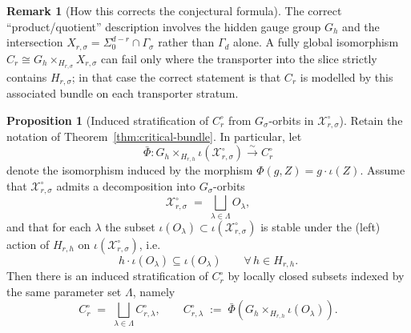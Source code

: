 \documentclass{article}
\theoremstyle{definition}
\newtheorem{proposition}[theorem]{Proposition}
\newtheorem{remark}[theorem]{Remark}
\begin{document}
\begin{remark}[How this corrects the conjectural formula]
The correct ``product/quotient'' description involves the hidden gauge group $G_h$ and the intersection $X_{r,\sigma} = \Sigma_0^{d-r} \cap \Gamma_\sigma$ rather than $\Gamma_d$ alone.  A fully global isomorphism $C_r \cong G_h \times_{H_{r,\sigma}} X_{r,\sigma}$ can fail only where the transporter into the slice strictly contains $H_{r,\sigma}$; in that case the correct statement is that $C_r$ is modelled by this associated bundle on each transporter stratum.
\end{remark}
\begin{proposition}[Induced stratification of $C_r^{\circ}$ from $G_\sigma$-orbits in $\mathcal X_{r,\sigma}^{\circ}$]
\label{prop:stratify-Cr-from-Xrsigma}
Retain the notation of Theorem~\ref{thm:critical-bundle}. In particular, let
\[
\bar\Phi \colon G_h \times_{H_{r,h}} \iota(\mathcal X_{r,\sigma}^{\circ}) \xrightarrow{\ \sim\ } C_r^{\circ}
\]
denote the isomorphism induced by the morphism $\Phi(g,Z)=g\cdot \iota(Z)$.
Assume that $\mathcal X_{r,\sigma}^{\circ}$ admits a decomposition into $G_\sigma$-orbits
\[
\mathcal X_{r,\sigma}^{\circ} \;=\; \bigsqcup_{\lambda\in\Lambda} O_\lambda,
\]
and that for each $\lambda$ the subset $\iota(O_\lambda)\subset \iota(\mathcal X_{r,\sigma}^{\circ})$ is stable under the (left) action of $H_{r,h}$ on $\iota(\mathcal X_{r,\sigma}^{\circ})$, i.e.
\[
h\cdot \iota(O_\lambda)\subseteq \iota(O_\lambda)\qquad \forall\, h\in H_{r,h}.
\]
Then there is an induced stratification of $C_r^{\circ}$ by locally closed subsets indexed by the same parameter set $\Lambda$, namely
\[
C_r^{\circ} \;=\; \bigsqcup_{\lambda\in\Lambda} C_{r,\lambda}^{\circ},
\qquad
C_{r,\lambda}^{\circ} \;:=\; \bar\Phi\!\left( G_h \times_{H_{r,h}} \iota(O_\lambda)\right).
\]
\end{proposition}
\end{document}
